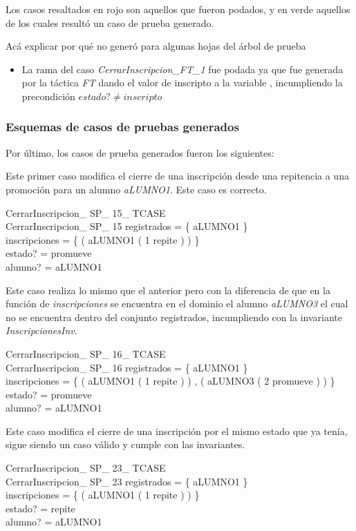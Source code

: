 \documentclass{article}
\begin{document}
Los casos resaltados en rojo son aquellos que fueron podados, y en verde aquellos de los cuales resultó un caso de prueba generado.

Acá explicar por qué no generó para algunas hojas del árbol de prueba
\begin{itemize}
    \item La rama del caso \emph{CerrarInscripcion\_FT\_1} fue podada ya que fue generada por la táctica \emph{FT} dando el valor de inscripto a la variable , incumpliendo
          la precondición $estado? \neq inscripto$
\end{itemize}

\subsubsection*{Esquemas de casos de pruebas generados}

Por último, los casos de prueba generados fueron los siguientes:

Este primer caso modifica el cierre de una inscripción desde una repitencia a una promoción para un alumno \emph{aLUMNO1}. Este caso es correcto.
\begin{schema}{CerrarInscripcion\_ SP\_ 15\_ TCASE}\\
 CerrarInscripcion\_ SP\_ 15 
\where
 registrados = \{ aLUMNO1 \} \\
 inscripciones = \{ ( aLUMNO1 \mapsto ( 1 \mapsto repite ) ) \} \\
 estado? = promueve \\
 alumno? = aLUMNO1
\end{schema}

Este caso realiza lo mismo que el anterior pero con la diferencia de que en la función de \emph{inscripciones} se encuentra en el dominio el alumno \emph{aLUMNO3} el cual no se encuentra dentro del conjunto {registrados}, incumpliendo con la invariante \emph{InscripcionesInv}.
\begin{schema}{CerrarInscripcion\_ SP\_ 16\_ TCASE}\\
 CerrarInscripcion\_ SP\_ 16 
\where
 registrados = \{ aLUMNO1 \} \\
 inscripciones = \{ ( aLUMNO1 \mapsto ( 1 \mapsto repite ) ) , ( aLUMNO3 \mapsto ( 2 \mapsto promueve ) ) \} \\
 estado? = promueve \\
 alumno? = aLUMNO1
\end{schema}

Este caso modifica el cierre de una inscripción por el mismo estado que ya tenía, sigue siendo un caso válido y cumple con las invariantes.
\begin{schema}{CerrarInscripcion\_ SP\_ 23\_ TCASE}\\
 CerrarInscripcion\_ SP\_ 23 
\where
 registrados = \{ aLUMNO1 \} \\
 inscripciones = \{ ( aLUMNO1 \mapsto ( 1 \mapsto repite ) ) \} \\
 estado? = repite \\
 alumno? = aLUMNO1
\end{schema}
\end{document}
